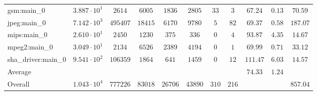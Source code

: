 \begin{tabular}{|l|c|c|c|c|c|c|c|c|c|c|}
gsm:main\_0             & $ 3.887 \cdot 10^{1} $ & $ 2614   $ & $ 6005  $ & $ 1836  $ & $ 2805  $ & $ 33  $ & $ 3   $ & $ 67.24       $ & $ 0.13    $ & $ 70.59   $ \\
jpeg:main\_0            & $ 7.142 \cdot 10^{3} $ & $ 495407 $ & $ 18415 $ & $ 6170  $ & $ 9780  $ & $ 5   $ & $ 82  $ & $ 69.37       $ & $ 0.58    $ & $ 187.07  $ \\
mips:main\_0            & $ 2.610 \cdot 10^{1} $ & $ 2450   $ & $ 1230  $ & $ 375   $ & $ 336   $ & $ 0   $ & $ 4   $ & $ 93.87       $ & $ 4.35    $ & $ 14.67   $ \\
mpeg2:main\_0           & $ 3.049 \cdot 10^{1} $ & $ 2134   $ & $ 6526  $ & $ 2389  $ & $ 4194  $ & $ 0   $ & $ 1   $ & $ 69.99       $ & $ 0.71    $ & $ 33.12   $ \\
sha\_driver:main\_0     & $ 9.541 \cdot 10^{2} $ & $ 106359 $ & $ 1864  $ & $ 641   $ & $ 1459  $ & $ 0   $ & $ 12  $ & $ 111.47      $ & $ 6.03    $ & $ 14.57   $ \\
\hline
Average                 & $                    $ & $        $ & $       $ & $       $ & $       $ & $     $ & $     $ & $ 74.33       $ & $ 1.24    $ & $         $ \\
\hline
Overall                 & $ 1.043 \cdot 10^{4} $ & $ 777226 $ & $ 83018 $ & $ 26706 $ & $ 43890 $ & $ 310 $ & $ 216 $ & $             $ & $         $ & $ 857.04  $ \\
\hline
\end{tabular}
